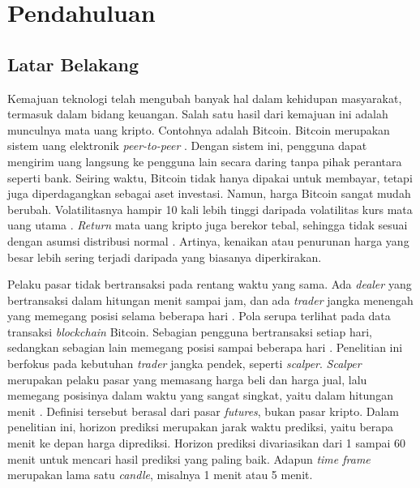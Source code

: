 \chapter{Pendahuluan}

\section{Latar Belakang}
\label{sec:latar}
Kemajuan teknologi telah mengubah banyak hal dalam kehidupan masyarakat,
termasuk dalam bidang keuangan. Salah satu hasil dari kemajuan ini adalah
munculnya mata uang kripto.
Contohnya adalah Bitcoin. Bitcoin merupakan sistem uang elektronik
\textit{peer-to-peer} \cite{nakamoto2008}. Dengan sistem ini, pengguna dapat
mengirim uang langsung ke pengguna lain secara daring tanpa pihak perantara
seperti bank.
Seiring waktu, Bitcoin tidak hanya dipakai untuk membayar, tetapi juga
diperdagangkan sebagai aset investasi.
Namun, harga Bitcoin sangat mudah berubah. Volatilitasnya hampir 10 kali
lebih tinggi daripada volatilitas kurs mata uang utama \cite{baur2021}.
\textit{Return} mata uang kripto juga berekor tebal, sehingga tidak sesuai
dengan asumsi distribusi normal \cite{mokni2024}. Artinya, kenaikan atau penurunan harga yang besar lebih
sering terjadi daripada yang biasanya diperkirakan.

Pelaku pasar tidak bertransaksi pada rentang waktu yang sama. Ada
\textit{dealer} yang bertransaksi dalam hitungan menit sampai jam, dan ada
\textit{trader} jangka menengah yang memegang posisi selama beberapa hari
\cite{muller1997}. Pola serupa terlihat pada data transaksi
\textit{blockchain} Bitcoin. Sebagian pengguna bertransaksi setiap hari,
sedangkan sebagian lain memegang posisi sampai beberapa hari \cite{liu2023}.
Penelitian ini berfokus pada kebutuhan \textit{trader} jangka pendek, seperti
\textit{scalper}.
\textit{Scalper} merupakan pelaku pasar yang memasang harga beli dan harga
jual, lalu memegang posisinya dalam waktu yang sangat singkat, yaitu dalam
hitungan menit \cite{silber1984}. Definisi tersebut berasal dari pasar
\textit{futures}, bukan pasar kripto.
Dalam penelitian ini, horizon prediksi merupakan jarak waktu prediksi, yaitu
berapa menit ke depan harga diprediksi. Horizon prediksi divariasikan dari 1
sampai 60 menit untuk mencari hasil prediksi yang paling baik. Adapun
\textit{time frame} merupakan lama satu \textit{candle}, misalnya 1 menit atau
5 menit.

